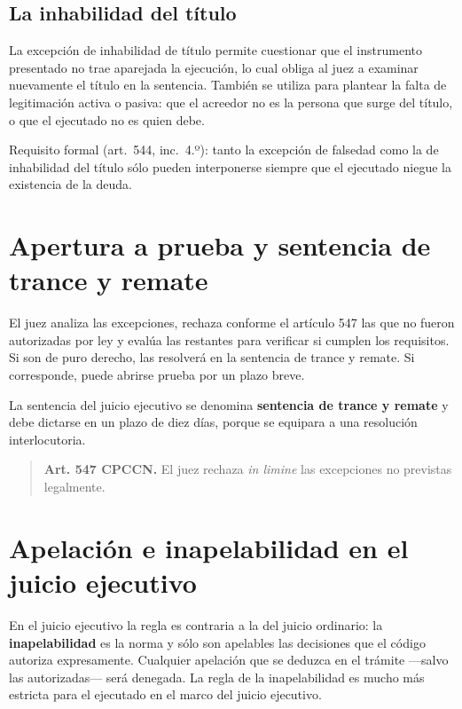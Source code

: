 \documentclass[12pt,oneside]{book}
\begin{document}
\subsection{La inhabilidad del título}

La excepción de inhabilidad de título permite cuestionar que el instrumento presentado no trae aparejada la ejecución, lo cual obliga al juez a examinar nuevamente el título en la sentencia. También se utiliza para plantear la falta de legitimación activa o pasiva: que el acreedor no es la persona que surge del título, o que el ejecutado no es quien debe.

\begin{important}
Requisito formal (art.~544, inc.~4.º): tanto la excepción de falsedad como la de inhabilidad del título sólo pueden interponerse siempre que el ejecutado niegue la existencia de la deuda.
\end{important}

\section{Apertura a prueba y sentencia de trance y remate}

El juez analiza las excepciones, rechaza conforme el artículo 547 las que no fueron autorizadas por ley y evalúa las restantes para verificar si cumplen los requisitos. Si son de puro derecho, las resolverá en la sentencia de trance y remate. Si corresponde, puede abrirse prueba por un plazo breve.

La sentencia del juicio ejecutivo se denomina \textbf{sentencia de trance y remate} y debe dictarse en un plazo de diez días, porque se equipara a una resolución interlocutoria.

\begin{quote}
\textbf{Art. 547 CPCCN.} El juez rechaza \emph{in limine} las excepciones no previstas legalmente.
\end{quote}

\section{Apelación e inapelabilidad en el juicio ejecutivo}

En el juicio ejecutivo la regla es contraria a la del juicio ordinario: la \textbf{inapelabilidad} es la norma y sólo son apelables las decisiones que el código autoriza expresamente. Cualquier apelación que se deduzca en el trámite ---salvo las autorizadas--- será denegada. La regla de la inapelabilidad es mucho más estricta para el ejecutado en el marco del juicio ejecutivo.
\end{document}
